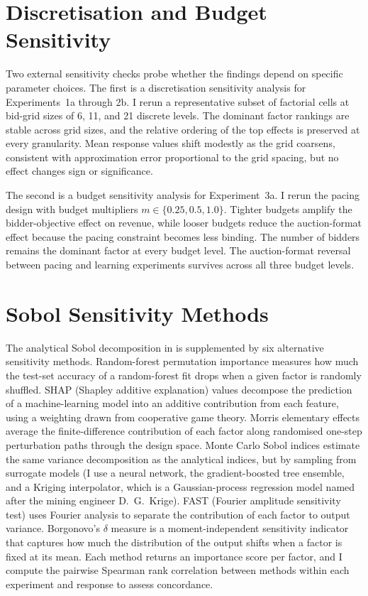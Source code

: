 \section{Discretisation and Budget Sensitivity}
\label{sec:app_sensitivity}

Two external sensitivity checks probe whether the findings depend on specific parameter choices. The first is a discretisation sensitivity analysis for Experiments~1a through 2b. I rerun a representative subset of factorial cells at bid-grid sizes of 6, 11, and 21 discrete levels. The dominant factor rankings are stable across grid sizes, and the relative ordering of the top effects is preserved at every granularity. Mean response values shift modestly as the grid coarsens, consistent with approximation error proportional to the grid spacing, but no effect changes sign or significance.

The second is a budget sensitivity analysis for Experiment~3a. I rerun the pacing design with budget multipliers $m \in \{0.25, 0.5, 1.0\}$. Tighter budgets amplify the bidder-objective effect on revenue, while looser budgets reduce the auction-format effect because the pacing constraint becomes less binding. The number of bidders remains the dominant factor at every budget level. The auction-format reversal between pacing and learning experiments survives across all three budget levels.

\section{Sobol Sensitivity Methods}
\label{sec:app_sobol}

The analytical Sobol decomposition in  is supplemented by six alternative sensitivity methods. Random-forest permutation importance measures how much the test-set accuracy of a random-forest fit drops when a given factor is randomly shuffled. SHAP (Shapley additive explanation) values decompose the prediction of a machine-learning model into an additive contribution from each feature, using a weighting drawn from cooperative game theory. Morris elementary effects average the finite-difference contribution of each factor along randomised one-step perturbation paths through the design space. Monte Carlo Sobol indices estimate the same variance decomposition as the analytical indices, but by sampling from surrogate models (I use a neural network, the gradient-boosted tree ensemble, and a Kriging interpolator, which is a Gaussian-process regression model named after the mining engineer D.\ G.\ Krige). FAST (Fourier amplitude sensitivity test) uses Fourier analysis to separate the contribution of each factor to output variance. Borgonovo's $\delta$ measure is a moment-independent sensitivity indicator that captures how much the distribution of the output shifts when a factor is fixed at its mean. Each method returns an importance score per factor, and I compute the pairwise Spearman rank correlation between methods within each experiment and response to assess concordance.

